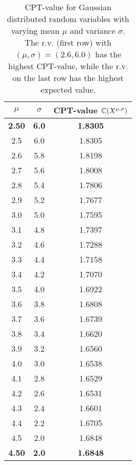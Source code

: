 \begin{table}
\centering
\begin{tabular}{|c|c|c|}
\toprule
$\mu$ & $\sigma$ & CPT-value $\mathbb{C}(X^{\mu,\sigma})$\\
\midrule
\textbf{2.50} & \textbf{6.0} & \textbf{1.8305}\\
2.5 & 6.0 & 1.8305\\
2.6 & 5.8 & 1.8198\\
2.7 & 5.6 & 1.8008\\
2.8 & 5.4 & 1.7806\\
2.9 & 5.2 & 1.7677\\
3.0 & 5.0 & 1.7595\\
3.1 & 4.8 & 1.7397\\
3.2 & 4.6 & 1.7288\\
3.3 & 4.4 & 1.7158\\
3.4 & 4.2 & 1.7070\\
3.5 & 4.0 & 1.6922\\
3.6 & 3.8 & 1.6808\\
3.7 & 3.6 & 1.6739\\
3.8 & 3.4 & 1.6620\\
3.9 & 3.2 & 1.6560\\
4.0 & 3.0 & 1.6538\\
4.1 & 2.8 & 1.6529\\
4.2 & 2.6 & 1.6531\\
4.3 & 2.4 & 1.6601\\
4.4 & 2.2 & 1.6705\\
4.5 & 2.0 & 1.6848\\
\textbf{4.50} & \textbf{2.0} & \textbf{1.6848}\\
\bottomrule
\end{tabular}
\caption{CPT-value for Gaussian distributed random variables with varying mean $\mu$ and variance $\sigma$. The r.v. (first row) with $(\mu,\sigma)=(2.6,6.0)$ has the highest CPT-value, while the r.v. on the last row has the highest expected value.}
\label{tab:gaussCPT}
\end{table}










